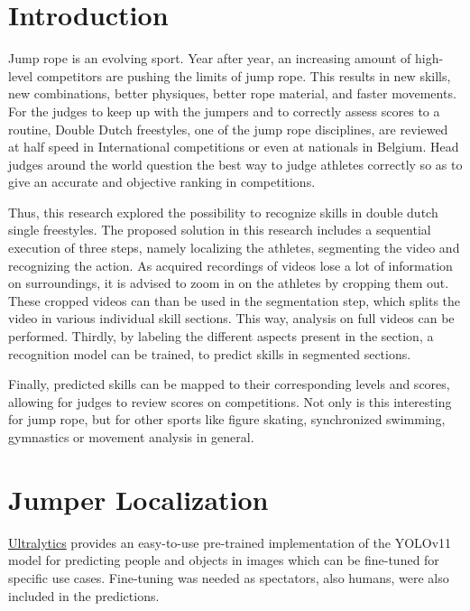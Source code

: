 \documentclass[english,a0,portrait]{hogent-poster}
\begin{document}
\begin{multicols}{2} %

\section{Introduction}

Jump rope is an evolving sport.
Year after year, an increasing amount of high-level competitors are pushing the limits of jump rope.
This results in new skills, new combinations, better physiques, better rope material, and faster movements. For the judges to keep up with the jumpers and to correctly assess scores to a routine, Double Dutch freestyles, one of the jump rope disciplines, are reviewed at half speed in International competitions or even at nationals in Belgium.
Head judges around the world question the best way to judge athletes correctly so as to give an accurate and objective ranking in competitions.

Thus, this research explored the possibility to recognize skills in double dutch single freestyles.
The proposed solution in this research includes a sequential execution of three steps, namely localizing the athletes, segmenting the video and recognizing the action.
As acquired recordings of videos lose a lot of information on surroundings, it is advised to zoom in on the athletes by cropping them out. These cropped videos can than be used in the segmentation step, which splits the video in various individual skill sections. This way, analysis on full videos can be performed. Thirdly, by labeling the different aspects present in the section, a recognition model can be trained, to predict skills in segmented sections.

Finally, predicted skills can be mapped to their corresponding levels and scores, allowing for judges to review scores on competitions. Not only is this interesting for jump rope, but for other sports like figure skating, synchronized swimming, gymnastics or movement analysis in general.

\section{Jumper Localization}

\href{https://github.com/ultralytics/ultralytics}{Ultralytics} provides an easy-to-use pre-trained implementation of the YOLOv11 model for predicting people and objects in images which can be fine-tuned for specific use cases. Fine-tuning was needed as spectators, also humans, were also included in the predictions.


\end{multicols}
\end{document}
